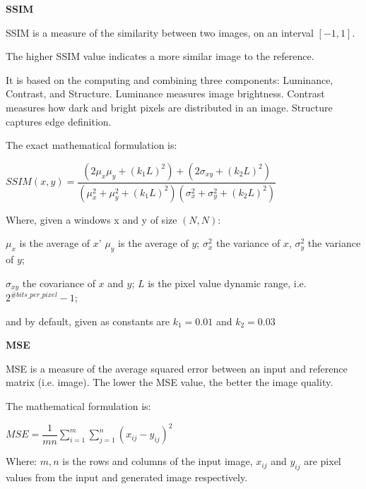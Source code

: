 \vspace{2mm}

\textbf{SSIM}


SSIM is a measure of the similarity between two images, on an interval $[-1, 1]$.

The higher SSIM value indicates a more similar image to the reference. 

It is based on the computing and combining three components: Luminance, Contrast, and Structure.
Luminance measures image brightness. Contrast measures how dark and bright pixels are distributed in an image. 
Structure captures edge definition. \citep{SSIM_bovik}
\vspace{2mm}

The exact mathematical formulation is:

\vspace{3mm}
\begin{center}
$SSIM(x,y) = \dfrac{(2\mu_x\mu_y + (k_1 L)^2) + (2 \sigma _{xy} + (k_2 L)^2)}{(\mu_x^2 + \mu_y^2+(k_1 L)^2) (\sigma_x^2 + \sigma_y^2+(k_2 L)^2)}$
\end{center}
\vspace{3mm}

Where, given a windows x and y of size $(N,N)$:

$\mu_x$ is the average of $x$'  $\mu_y$ is the average of $y$;  $\sigma _{x}^{2}$ the variance of $x$, $\sigma _{y}^{2}$ the variance of $y$;

$\sigma_{xy}$ the covariance of $x$ and $y$; $L$ is the pixel value dynamic range, i.e. $2^{\#bits\_per\_pixel}-1$;

and by default, given as constants are $k_{1}=0.01$ and $k_{2}=0.03$ \citep{SSIM_bovik}

\vspace{4mm}

\textbf{MSE}


MSE is a measure of the average squared error between an input and reference matrix (i.e. image). 
The lower the MSE value, the better the image quality.

The mathematical formulation is:

\vspace{3mm}

\begin{center}
$MSE=\dfrac{1}{mn} \sum_{i=1}^m \sum_{j=1}^n (x_{ij}-y_{ij})^2 $
\end{center}


Where:
$m,n$ is the rows and columns of the input image,
$x_{ij}$ and $y_{ij}$ are pixel values from the input and generated image respectively. \citep{Metrics}


